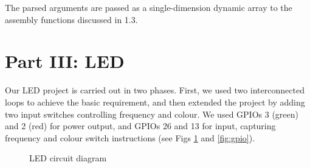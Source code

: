\documentclass[11pt]{article}
\begin{document}
\begin{table}[ht]
    \centering
    \caption{Argument flags and parameters}
    \label{tab:arg_flag}
\end{table}

The parsed arguments are passed as a single-dimension dynamic array to the assembly functions discussed in 1.3.

\section{Part III: LED}

Our LED project is carried out in two phases. First, we used two interconnected loops to achieve the basic requirement, and then extended the project by adding two input switches controlling frequency and colour. We used GPIOs 3 (green) and 2 (red) for power output, and GPIOs 26 and 13 for input, capturing frequency and colour switch instructions (see Figs \ref{fig:LED_Circuit} and \ref{fig:gpio}).

\begin{figure}[ht]
    \centering
    \scalebox{0.7}{}
    \caption{LED circuit diagram}
    \label{fig:LED_Circuit}
\end{figure}
\end{document}
